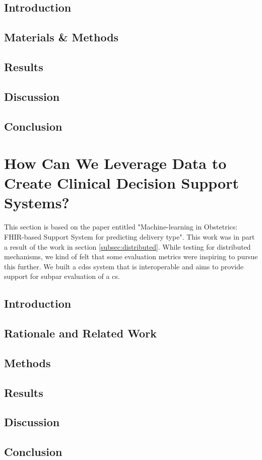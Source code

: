     
\subsection{Introduction}
    
    \subsection{Materials \& Methods}
    
    \subsection{Results}
    
    \subsection{Discussion}
    
    \subsection{Conclusion}
    
    
    
    \section{How Can We Leverage Data to Create Clinical Decision Support Systems?}\label{subsec:obs}
    This section is based on the paper entitled "Machine-learning in Obstetrics: FHIR-based Support System for predicting delivery type". This work was in part a result of the work in section \ref{subsec:distributed}. While testing for distributed mechanisms, we kind of felt that some evaluation metrics were inspiring to pursue this further. We built a \ac{cdss} system that is interoperable and aims to provide support for subpar evaluation of a \ac{cs}.
    
    \subsection{Introduction}
    
    \subsection{Rationale and Related Work}
    
    \subsection{Methods}

    
    \subsection{Results}
    
    \subsection{Discussion}
    
    \subsection{Conclusion}
    
    
    
    
    